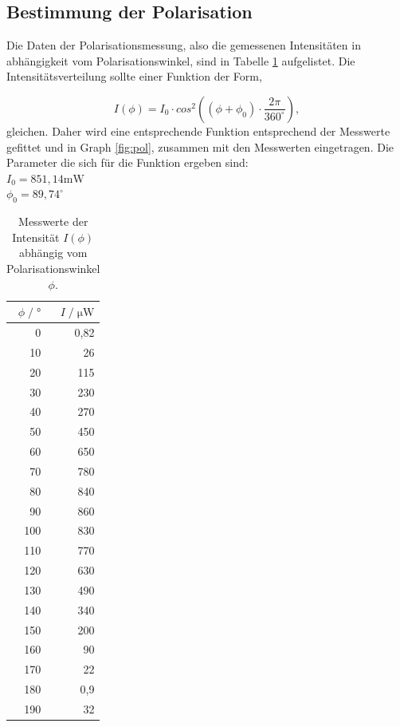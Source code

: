 \subsection{Bestimmung der Polarisation}
\label{sec:estimmung der Polarisation}
Die Daten der Polarisationsmessung, also die gemessenen Intensitäten in abhängigkeit vom Polarisationswinkel, sind in Tabelle \ref{tab:pol} aufgelistet.
Die Intensitätsverteilung sollte einer Funktion der Form,

\begin{equation}
\label{equ:}
  I(\phi) = I_0 \cdot cos^2 \left((\phi + \phi_0) \cdot \frac{2 \pi}{360^{\circ}}\right),
\end{equation}
gleichen.
Daher wird eine entsprechende Funktion entsprechend der Messwerte gefittet und in Graph \ref{fig:pol}, zusammen mit den Messwerten eingetragen.
Die Parameter die sich für die Funktion ergeben sind: \\
$I_0 = 851,14 \si{\milli\watt}$ \\
$\phi_0 = 89,74^{\circ}$ 


\begin{table}[H]
  \centering
  \footnotesize
  \caption{Messwerte der Intensität $I(\phi)$ abhängig vom Polarisationswinkel $\phi$.}
  \label{tab:pol}
  \begin{tabular}{r r}
  \toprule
  $\phi \;/\; \si{\degree}$ & $I \;/\; \si{\micro\watt}$ \\
  \midrule
    0   & 0,82 \\
    10  & 26   \\ 
    20  & 115  \\
    30  & 230  \\
    40  & 270  \\
    50  & 450  \\
    60  & 650  \\
    70  & 780  \\
    80  & 840  \\
    90  & 860  \\
    100 & 830  \\
    110 & 770  \\
    120 & 630  \\
    130 & 490  \\
    140 & 340  \\
    150 & 200  \\
    160 & 90   \\
    170 & 22   \\
    180 & 0,9  \\
    190 & 32   \\
  \bottomrule
  \end{tabular}
\end{table}


